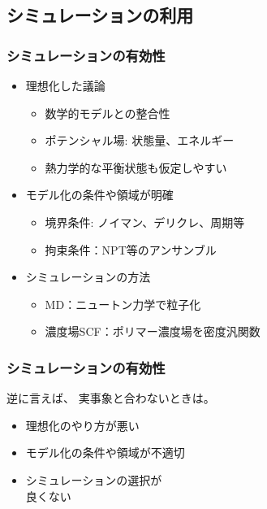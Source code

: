 \documentclass[10pt, dvipdfmx]{beamer}
\begin{document}
\subsection{シミュレーションの利用}
\begin{frame}\frametitle{シミュレーションの有効性}
\large
\begin{itemize}
	\item
	理想化した議論
	\large
	\begin{itemize}
		\large
		\item
		数学的モデルとの整合性
		\item
		ポテンシャル場: 状態量、エネルギー	
		\item
		熱力学的な平衡状態も仮定しやすい
	\end{itemize}
	\item
	モデル化の条件や領域が明確
	\begin{itemize}
		\large
		\item
		境界条件: ノイマン、デリクレ、周期等
		\item
		拘束条件：NPT等のアンサンブル
	\end{itemize}
	\item
	シミュレーションの方法
	\begin{itemize}
		\large
		\item
		MD：ニュートン力学で粒子化
		\item
		濃度場SCF：ポリマー濃度場を密度汎関数		
	\end{itemize}
\end{itemize}
\end{frame}
\begin{frame}\frametitle{シミュレーションの有効性}
\LARGE

\begin{alertblock}{逆に言えば、}
実事象と合わないときは。
\begin{itemize}
	\item
	理想化のやり方が悪い
	\item
	モデル化の条件や領域が不適切
	\item
	シミュレーションの選択が\\良くない
\end{itemize}
\end{alertblock}
\end{frame}
\end{document}
